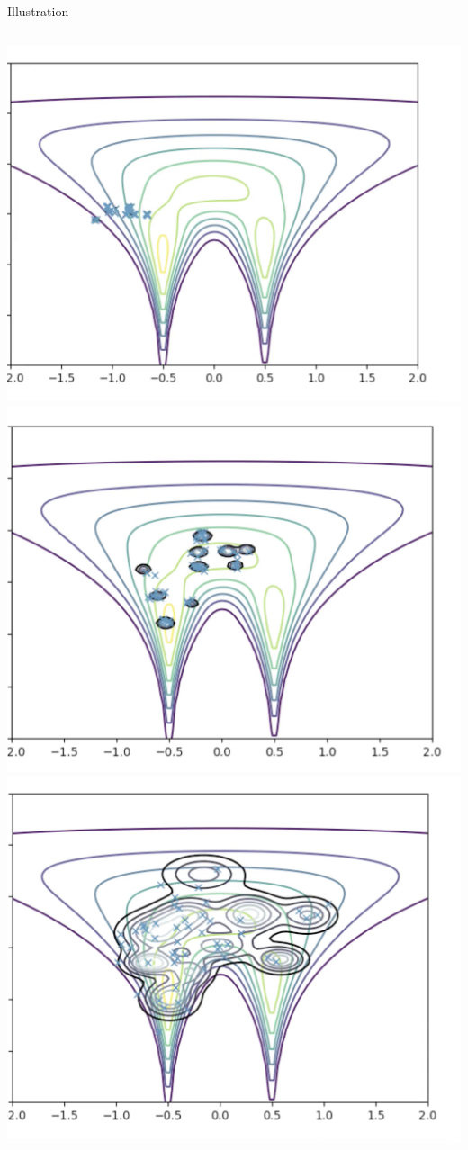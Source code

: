 \documentclass[10pt]{beamer}
\numberwithin{equation}{section}
\theoremstyle{definition}
\newcommand{\+}[1]{\ensuremath{{\boldsymbol #1}}} %
\begin{document}
\begin{frame}{Illustration}
\begin{minipage}[t][.9\textheight]{\textwidth}
\begin{columns}[t]
\centering
\includegraphics[width=.7\textwidth]{images/intro_animation_1.png}\\
\includegraphics[width=.7\textwidth]{images/intro_animation_2.png}
\centering
\includegraphics[width=.7\textwidth]{images/intro_animation_3.png}\\

\end{columns}
\end{minipage}
\end{frame}
\end{document}
